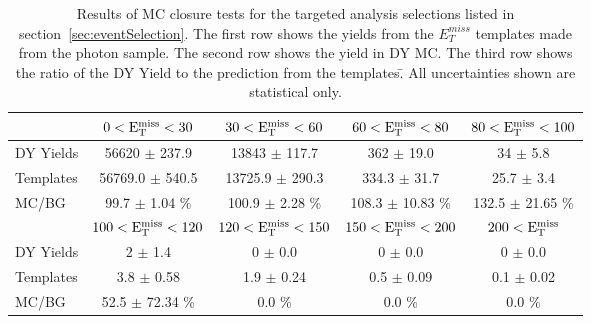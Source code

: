 \begin{table}[htb]
\scriptsize
\begin{center}
\caption{\label{table:targeted} Results of MC closure tests for the targeted analysis selections listed in section~\ref{sec:eventSelection}. The first row shows the yields from the $E^{miss}_T$ templates made from the photon sample. The second row shows the yield in DY MC. The third row shows the ratio of the DY Yield to the prediction from the templates.̄ All uncertainties shown are statistical only. }
\begin{tabular}{l|c|c|c|c}
\hline
\hline
          & $0 < \rm{E_{T}^{miss}} < 30$  & $30 < \rm{E_{T}^{miss}} < 60$  & $60 < \rm{E_{T}^{miss}} < 80$  & $80 < \rm{E_{T}^{miss}} < 100$  \\ 
\hline
DY Yields & 56620 $\pm$ 237.9 & 13843 $\pm$ 117.7 &   362 $\pm$ 19.0 &     34 $\pm$ 5.8 \\
Templates & 56769.0 $\pm$ 540.5 & 13725.9 $\pm$ 290.3 & 334.3 $\pm$ 31.7 &  25.7 $\pm$ 3.4 \\
    MC/BG & 99.7 $\pm$ 1.04 \% & 100.9 $\pm$ 2.28 \% & 108.3 $\pm$ 10.83 \% & 132.5 $\pm$ 21.65 \% \\
\hline
\hline
          & $100 < \rm{E_{T}^{miss}} < 120$  & $120 < \rm{E_{T}^{miss}} < 150$  & $150 < \rm{E_{T}^{miss}} < 200$  &    $200 < \rm{E_{T}^{miss}}$  \\ 
\hline
DY Yields &      2 $\pm$ 1.4 &      0 $\pm$ 0.0 &      0 $\pm$ 0.0 &      0 $\pm$ 0.0 \\
Templates &   3.8 $\pm$ 0.58 &   1.9 $\pm$ 0.24 &   0.5 $\pm$ 0.09 &   0.1 $\pm$ 0.02 \\
    MC/BG & 52.5 $\pm$ 72.34 \% & 0.0 \% & 0.0 \% & 0.0 \% \\
\hline
\hline
\end{tabular}
\end{center}
\end{table}

\clearpage
